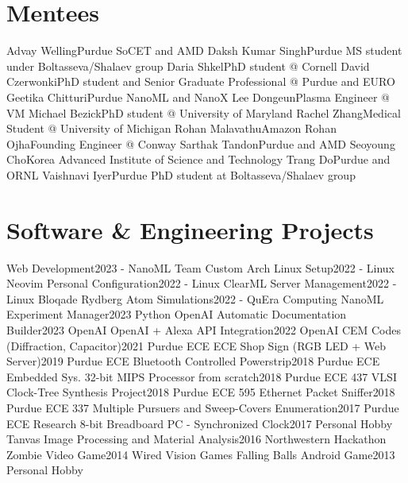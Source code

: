 \section{Mentees}
  \resumeSubHeadingListStart
    \resumeSubheadingSimple
      {Advay Welling}{Purdue SoCET and AMD}
    \resumeSubheadingSimple
      {Daksh Kumar Singh}{Purdue MS student under Boltasseva/Shalaev group}
    \resumeSubheadingSimple
      {Daria Shkel}{PhD student @ Cornell}
    \resumeSubheadingSimple
      {David Czerwonki}{PhD student and Senior Graduate Professional @ Purdue and EURO}
    \resumeSubheadingSimple
      {Geetika Chitturi}{Purdue NanoML and NanoX}
    \resumeSubheadingSimple
      {Lee Dongeun}{Plasma Engineer @ VM}
    \resumeSubheadingSimple
      {Michael Bezick}{PhD student @ University of Maryland}
    \resumeSubheadingSimple
      {Rachel Zhang}{Medical Student @ University of Michigan}
    \resumeSubheadingSimple
      {Rohan Malavathu}{Amazon}
    \resumeSubheadingSimple
      {Rohan Ojha}{Founding Engineer @ Conway}
    \resumeSubheadingSimple
      {Sarthak Tandon}{Purdue and AMD}
    \resumeSubheadingSimple
      {Seoyoung Cho}{Korea Advanced Institute of Science and Technology}
    \resumeSubheadingSimple
      {Trang Do}{Purdue and ORNL}
    \resumeSubheadingSimple
      {Vaishnavi Iyer}{Purdue PhD student at Boltasseva/Shalaev group}
  \resumeSubHeadingListEnd
\section{Software \& Engineering Projects}
  \resumeSubHeadingListStart
    \resumeSubheading
      {Web Development}{2023 -}
      {NanoML Team}{}
    \resumeSubheading
      {Custom Arch Linux Setup}{2022 -}
      {Linux}{}
    \resumeSubheading
      {Neovim Personal Configuration}{2022 -}
      {Linux}{}
    \resumeSubheading
      {ClearML Server Management}{2022 -}
      {Linux}{}
    \resumeSubheading
      {Bloqade Rydberg Atom Simulations}{2022 -}
      {QuEra Computing}{}
    \resumeSubheading
      {NanoML Experiment Manager}{2023}
      {Python}{}
    \resumeSubheading
      {OpenAI Automatic Documentation Builder}{2023}
      {OpenAI}{}
    \resumeSubheading
      {OpenAI + Alexa API Integration}{2022}
      {OpenAI}{}
    \resumeSubheading
      {CEM Codes (Diffraction, Capacitor)}{2021}
      {Purdue ECE}{}
    \resumeSubheading
      {ECE Shop Sign (RGB LED + Web Server)}{2019}
      {Purdue ECE}{}
    \resumeSubheading
      {Bluetooth Controlled Powerstrip}{2018}
      {Purdue ECE Embedded Sys.}{}
    \resumeSubheading
      {32-bit MIPS Processor from scratch}{2018}
      {Purdue ECE 437}{}
    \resumeSubheading
      {VLSI Clock-Tree Synthesis Project}{2018}
      {Purdue ECE 595}{}
    \resumeSubheading
      {Ethernet Packet Sniffer}{2018}
      {Purdue ECE 337}{}
    \resumeSubheading
      {Multiple Pursuers and Sweep-Covers Enumeration}{2017}
      {Purdue ECE Research}{}
    \resumeSubheading
      {8-bit Breadboard PC - Synchronized Clock}{2017}
      {Personal Hobby}{}
    \resumeSubheading
      {Tanvas Image Processing and Material Analysis}{2016}
      {Northwestern Hackathon}{}
    \resumeSubheading
      {Zombie Video Game}{2014}
      {Wired Vision Games}{}
    \resumeSubheading
      {Falling Balls Android Game}{2013}
      {Personal Hobby}{}
  \resumeSubHeadingListEnd
